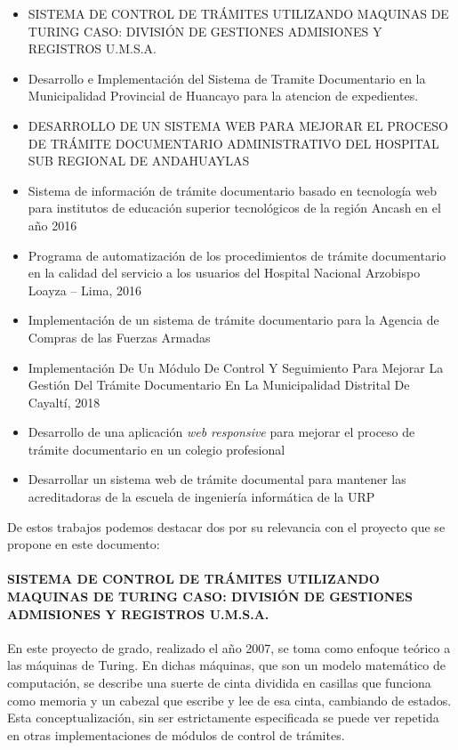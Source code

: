\begin{itemize}
    \item SISTEMA DE CONTROL DE TRÁMITES UTILIZANDO MAQUINAS DE TURING CASO: DIVISIÓN DE GESTIONES ADMISIONES Y REGISTROS U.M.S.A.
    \item Desarrollo e Implementación del Sistema de Tramite
          Documentario en la Municipalidad Provincial de
          Huancayo para la atencion de expedientes.
    \item DESARROLLO DE UN SISTEMA WEB PARA MEJORAR  EL PROCESO DE TRÁMITE DOCUMENTARIO ADMINISTRATIVO DEL HOSPITAL SUB REGIONAL DE  ANDAHUAYLAS
    \item Sistema de información de trámite documentario basado en tecnología web para institutos de educación superior tecnológicos de la región Ancash en el año 2016
    \item Programa de automatización de los procedimientos de trámite documentario en la calidad del servicio a los usuarios del Hospital Nacional Arzobispo Loayza – Lima, 2016
    \item Implementación de un sistema de trámite documentario para la Agencia de Compras de las Fuerzas Armadas
    \item Implementación De Un Módulo De Control Y Seguimiento Para Mejorar La Gestión Del Trámite Documentario En La Municipalidad Distrital De Cayaltí, 2018
    \item Desarrollo de una aplicación \textit{web responsive} para mejorar el proceso de trámite documentario en un colegio profesional
    \item Desarrollar un sistema web de trámite documental para mantener las acreditadoras de la escuela de ingeniería informática de la URP
\end{itemize}

De estos trabajos podemos destacar dos por su relevancia con el proyecto que se propone en este documento:

\paragraph{SISTEMA DE CONTROL DE TRÁMITES UTILIZANDO MAQUINAS DE TURING CASO: DIVISIÓN DE GESTIONES ADMISIONES Y REGISTROS U.M.S.A.}

En este proyecto de grado, realizado el año 2007, se toma como enfoque teórico a las máquinas de Turing. En dichas máquinas, que son un modelo matemático de computación, se describe una suerte de cinta dividida en casillas que funciona como memoria y un cabezal que escribe y lee de esa cinta, cambiando de estados. Esta conceptualización, sin ser estrictamente especificada se puede ver repetida en otras implementaciones de módulos de control de trámites.

